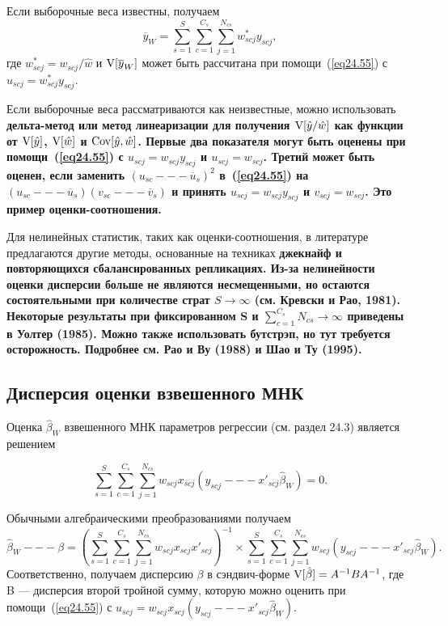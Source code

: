 Если выборочные веса известны, получаем
$$
\overline{y}_W = \sum_{s=1}^S \sum_{c=1}^{C_s} \sum_{j=1}^{N_{cs}} w^*_{scj} y_{scj},
$$
где $w^*_{scj} =w_{scj} / \hat w$ и $\mathrm{V}[\overline{y}_W]$ может быть рассчитана при помощи~(\ref{eq24.55}) с $u_{scj} = w^*_{scj} y_{scj}$. 

Если выборочные веса рассматриваются как неизвестные, можно использовать \bfseries дельта-метод \mdseries или \bfseries  метод линеаризации \mdseries для получения $\mathrm{V}[\hat y / \hat w]$ как функции от $\mathrm{V}[\hat y]$, $\mathrm{V}[\hat w]$ и $\mathrm{Cov}[\hat y, \hat w]$. Первые два показателя могут быть оценены при помощи~(\ref{eq24.55}) с $u_{scj} = w_{scj} y_{scj}$ и $u_{scj} = w_{scj}$. Третий может быть оценен, если заменить $(u_{sc} --- \overline{u}_s)^2$ в~(\ref{eq24.55}) на $(u_{sc} --- \overline{u}_s) (v_{sc} --- \overline{v}_s)$ и принять $u_{scj} = w_{scj} y_{scj}$ и $v_{scj} = w_{scj}$. Это пример оценки-соотношения. 

Для нелинейных статистик, таких как оценки-соотношения, в литературе предлагаются другие методы, основанные на техниках \bfseries джекнайф \mdseries и \bfseries повторяющихся сбалансированных репликациях. \mdseries Из-за нелинейности оценки дисперсии больше не являются несмещенными, но остаются состоятельными при количестве страт $S \to \infty$ (см. Кревски и Рао, 1981). Некоторые результаты при фиксированном S и $\sum_{c=1}^{C_s} N_{cs} \to \infty$ приведены в Уолтер (1985). Можно также использовать \bfseries бутстрэп\mdseries, но тут требуется осторожность. Подробнее см. Рао и Ву (1988) и Шао и Ту (1995). 


\subsection*{Дисперсия оценки взвешенного МНК}

Оценка $\hat \beta_W$ взвешенного МНК параметров регрессии (см. раздел 24.3) является решением

$$
\sum_{s=1}^S \sum_{c=1}^{C_s} \sum_{j=1}^{N_{cs}} w_{scj} x_{scj} (y_{scj} --- x'_{scj} \hat \beta_W) = 0.
$$

Обычными алгебраическими преобразованиями получаем
$$
\hat \beta_W --- \beta = \left( \sum_{s=1}^S \sum_{c=1}^{C_s} \sum_{j=1}^{N_{cs}} w_{scj} x_{scj} x'_{scj} \right)^{-1} \times \sum_{s=1}^S \sum_{c=1}^{C_s} \sum_{j=1}^{N_{cs}} w_{scj} (y_{scj} --- x'_{scj} \hat \beta_W).
$$
Соответственно, получаем дисперсию $\beta$ в сэндвич-форме $\mathrm{V}[\hat \beta] = A^{-1} B A^{-1}$, где B --- дисперсия второй тройной сумму, которую можно оценить при помощи~(\ref{eq24.55}) с $u_{scj} = w_{scj} x_{scj} (y_{scj} --- x'_{scj} \hat \beta_W)$. 

